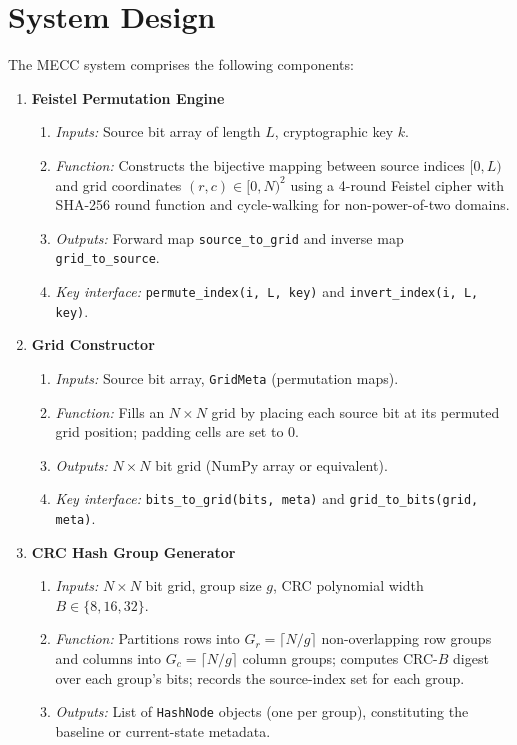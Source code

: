 \chapter*{System Design}
The MECC system comprises the following components:
    \begin{enumerate}

        \item \textbf{Feistel Permutation Engine}
            \begin{enumerate}
                \item \textit{Inputs:} Source bit array of length $L$, cryptographic key $k$.
                \item \textit{Function:} Constructs the bijective mapping between source indices $[0, L)$ and grid coordinates $(r, c) \in [0, N)^2$ using a 4-round Feistel cipher with SHA-256 round function and cycle-walking for non-power-of-two domains.
                \item \textit{Outputs:} Forward map \texttt{source\_to\_grid} and inverse map \texttt{grid\_to\_source}.
                \item \textit{Key interface:} \texttt{permute\_index(i, L, key)} and \texttt{invert\_index(i, L, key)}.
            \end{enumerate}

        \item \textbf{Grid Constructor}
            \begin{enumerate}
                \item \textit{Inputs:} Source bit array, \texttt{GridMeta} (permutation maps).
                \item \textit{Function:} Fills an $N \times N$ grid by placing each source bit at its permuted grid position; padding cells are set to 0.
                \item \textit{Outputs:} $N \times N$ bit grid (NumPy array or equivalent).
                \item \textit{Key interface:} \texttt{bits\_to\_grid(bits, meta)} and \texttt{grid\_to\_bits(grid, meta)}.
            \end{enumerate}

        \item \textbf{CRC Hash Group Generator}
            \begin{enumerate}
                \item \textit{Inputs:} $N \times N$ bit grid, group size $g$, CRC polynomial width $B \in \{8, 16, 32\}$.
                \item \textit{Function:} Partitions rows into $G_r = \lceil N/g \rceil$ non-overlapping row groups and columns into $G_c = \lceil N/g \rceil$ column groups; computes CRC-$B$ digest over each group's bits; records the source-index set for each group.
                \item \textit{Outputs:} List of \texttt{HashNode} objects (one per group), constituting the baseline or current-state metadata.
            \end{enumerate}


\end{enumerate}
